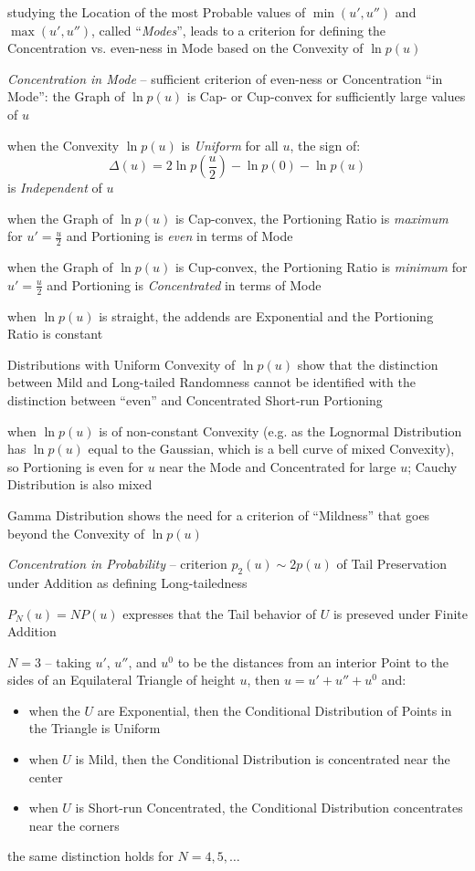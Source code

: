 studying the Location of the most Probable values of $\min(u', u'')$ and
$\max(u', u'')$, called ``\emph{Modes}'', leads to a criterion for defining the
Concentration vs. even-ness in Mode based on the Convexity of $\ln p(u)$

\emph{Concentration in Mode} -- sufficient criterion of even-ness or
Concentration ``in Mode'': the Graph of $\ln p(u)$ is Cap- or Cup-convex for
sufficiently large values of $u$

when the Convexity $\ln p(u)$ is \emph{Uniform} for all $u$, the sign of:
\[
  \Delta(u) = 2 \ln p(\frac{u}{2}) - \ln p(0) - \ln p(u)
\]
is \emph{Independent} of $u$

when the Graph of $\ln p(u)$ is Cap-convex, the Portioning Ratio is
\emph{maximum} for $u' = \frac{u}{2}$ and Portioning is \emph{even} in terms of
Mode

when the Graph of $\ln p(u)$ is Cup-convex, the Portioning Ratio is
\emph{minimum} for $u' = \frac{u}{2}$ and Portioning is \emph{Concentrated} in
terms of Mode

when $\ln p(u)$ is straight, the addends are Exponential and the Portioning
Ratio is constant

Distributions with Uniform Convexity of $\ln p(u)$ show that the distinction
between Mild and Long-tailed Randomness cannot be identified with the
distinction between ``even'' and Concentrated Short-run Portioning

when $\ln p(u)$ is of non-constant Convexity (e.g. as the Lognormal Distribution
has $\ln p(u)$ equal to the Gaussian, which is a bell curve of mixed Convexity),
so Portioning is even for $u$ near the Mode and Concentrated for large $u$;
Cauchy Distribution is also mixed

\fist Gamma Distribution shows the need for a criterion of ``Mildness'' that
goes beyond the Convexity of $\ln p(u)$

\emph{Concentration in Probability} -- criterion $p_2(u) \sim 2p(u)$ of Tail
Preservation under Addition as defining Long-tailedness

$P_N(u) = NP(u)$ expresses that the Tail behavior of $U$ is preseved under
Finite Addition

$N = 3$ -- taking $u'$, $u''$, and $u^0$ to be the distances from an interior
Point to the sides of an Equilateral Triangle of height $u$, then $u = u' + u''
+ u^0$ and:
\begin{itemize}
  \item when the $U$ are Exponential, then the Conditional Distribution of
    Points in the Triangle is Uniform
  \item when $U$ is Mild, then the Conditional Distribution is concentrated near
    the center
  \item when $U$ is Short-run Concentrated, the Conditional Distribution
    concentrates near the corners
\end{itemize}
the same distinction holds for $N = 4, 5, \ldots$

